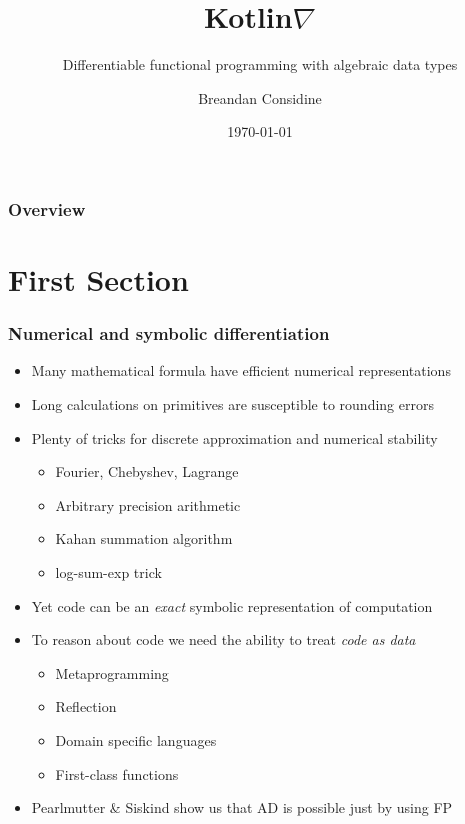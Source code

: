 \documentclass{beamer}
\title{Kotlin\texorpdfstring{$\nabla$}{}}
\subtitle{Differentiable functional programming with algebraic data types}
\author{Breandan Considine}
\institute[UdeM]{
Universit\'e de Montr\'eal \\
\medskip
\textit{breandan.considine@umontreal.ca}
}
\date{\today}
\begin{document}
    \begin{frame}
        \titlepage
    \end{frame}

    \begin{frame}
        \frametitle{Overview}
        \tableofcontents
    \end{frame}

    \section{First Section}\label{sec:first-section}


    \begin{frame}
        \frametitle{Numerical and symbolic differentiation}
        \begin{itemize}
            \item Many mathematical formula have efficient numerical representations
            \item Long calculations on primitives are susceptible to rounding errors
            \item Plenty of tricks for discrete approximation and numerical stability
            \begin{itemize}
                \item Fourier, Chebyshev, Lagrange
                \item Arbitrary precision arithmetic
                \item Kahan summation algorithm
                \item log-sum-exp trick
            \end{itemize}
            \item Yet code can be an \textit{exact} symbolic representation of computation
            \item To reason about code we need the ability to treat \textit{code as data}
            \begin{itemize}
                \item Metaprogramming
                \item Reflection
                \item Domain specific languages
                \item First-class functions
            \end{itemize}
            \item Pearlmutter \& Siskind show us that AD is possible just by using FP
        \end{itemize}
    \end{frame}
\end{document}
